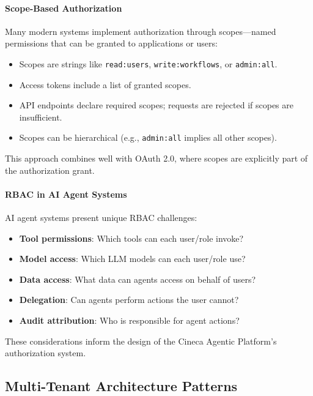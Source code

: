 \documentclass[a4paper,twoside]{sapthesis}
\begin{document}
\paragraph{Scope-Based Authorization}

Many modern systems implement authorization through scopes---named permissions that can be granted to applications or users:

\begin{itemize}
    \item Scopes are strings like \texttt{read:users}, \texttt{write:workflows}, or \texttt{admin:all}.
    \item Access tokens include a list of granted scopes.
    \item API endpoints declare required scopes; requests are rejected if scopes are insufficient.
    \item Scopes can be hierarchical (e.g., \texttt{admin:all} implies all other scopes).
\end{itemize}

This approach combines well with OAuth 2.0, where scopes are explicitly part of the authorization grant.

\paragraph{RBAC in AI Agent Systems}

AI agent systems present unique RBAC challenges:

\begin{itemize}
    \item \textbf{Tool permissions}: Which tools can each user/role invoke?
    \item \textbf{Model access}: Which LLM models can each user/role use?
    \item \textbf{Data access}: What data can agents access on behalf of users?
    \item \textbf{Delegation}: Can agents perform actions the user cannot?
    \item \textbf{Audit attribution}: Who is responsible for agent actions?
\end{itemize}

These considerations inform the design of the Cineca Agentic Platform's authorization system.

\subsection{Multi-Tenant Architecture Patterns}
\end{document}
